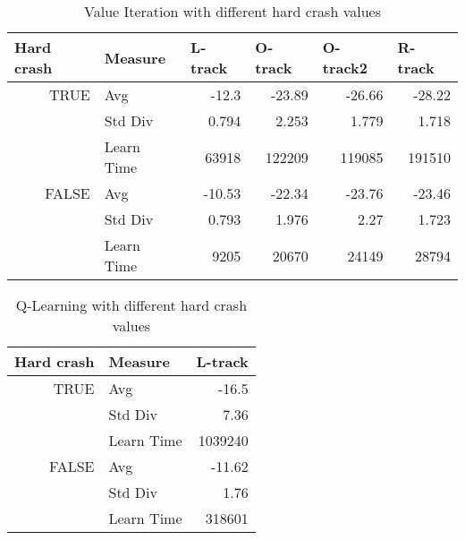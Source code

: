 \documentclass[12pt, letterpaper]{article}
\begin{document}
\begin{table}[htbp]
\caption{Value Iteration with different hard crash values}
\begin{center}
\begin{tabular}{|l|l|r|r|r|r|}
\hline
\textbf{Hard crash} & \textbf{Measure} & \multicolumn{1}{l|}{\textbf{L-track}} & \multicolumn{1}{l|}{\textbf{O-track}} & \multicolumn{1}{l|}{\textbf{O-track2}} & \multicolumn{1}{l|}{\textbf{R-track}} \\ \hline
\multicolumn{1}{|r|}{TRUE} & Avg & -12.3 & -23.89 & -26.66 & -28.22 \\ \hline
 & Std Div & 0.794 & 2.253 & 1.779 & 1.718 \\ \hline
 & Learn Time & 63918 & 122209 & 119085 & 191510 \\ \hline
\multicolumn{1}{|r|}{FALSE} & Avg & -10.53 & -22.34 & -23.76 & -23.46 \\ \hline
 & Std Div & 0.793 & 1.976 & 2.27 & 1.723 \\ \hline
 & Learn Time & 9205 & 20670 & 24149 & 28794 \\ \hline
\end{tabular}
\end{center}
\label{vi_crash}
\end{table}

\begin{table}[htbp]
\caption{Q-Learning with different hard crash values}
\begin{center}
\begin{tabular}{|l|l|r|}
\hline
\textbf{Hard crash} & \textbf{Measure} & \multicolumn{1}{l|}{\textbf{L-track}} \\ \hline
\multicolumn{1}{|r|}{TRUE} & Avg & -16.5 \\ \hline
 & Std Div & 7.36 \\ \hline
 & Learn Time & 1039240 \\ \hline
\multicolumn{1}{|r|}{FALSE} & Avg & -11.62 \\ \hline
 & Std Div & 1.76 \\ \hline
 & Learn Time & 318601 \\ \hline
\end{tabular}
\end{center}
\label{q_crash}
\end{table}
\end{document}
